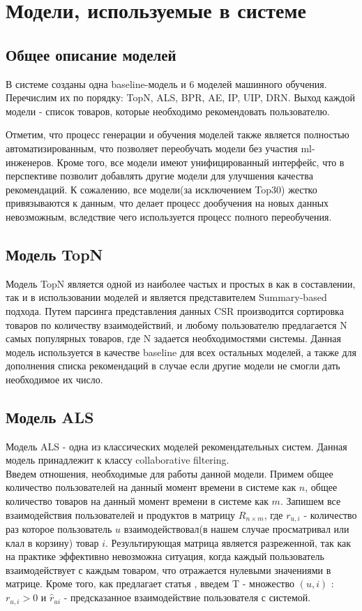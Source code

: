 \documentclass[14pt]{mmcs_article}
\begin{document}
\section{Модели, используемые в системе}

\subsection{Общее описание моделей}
В системе созданы одна baseline-модель и 6 моделей машинного обучения. Перечислим их по порядку: TopN, ALS, BPR, AE, IP, UIP, DRN. Выход каждой модели - список товаров, которые необходимо рекомендовать пользователю. 

Отметим, что процесс генерации и обучения моделей также является полностью автоматизированным, что позволяет переобучать модели без участия ml-инженеров. Кроме того, все модели имеют унифицированный интерфейс, что в перспективе позволит добавлять другие модели для улучшения качества рекомендаций. К сожалению, все модели(за исключением Top30) жестко привязываются к данным, что делает процесс дообучения на новых данных невозможным, вследствие чего используется процесс полного переобучения. 


\subsection{Модель TopN}
Модель TopN является одной из наиболее частых и простых в как в составлении, так и в использовании моделей и является представителем Summary-based подхода. \cite{ALS:recsys} Путем парсинга представления данных CSR производится сортировка товаров по количеству взаимодействий, и любому пользователю предлагается N самых популярных товаров, где N задается необходимостями системы. Данная модель используется в качестве baseline для всех остальных моделей, а также для дополнения списка рекомендаций в случае если другие модели не смогли дать необходимое их число.
\subsection{Модель ALS}
Модель ALS \cite{ALS:CFIFD} - одна из классических моделей рекомендательных систем. Данная модель принадлежит к классу collaborative filtering. \\
Введем отношения, необходимые для работы данной модели.
Примем общее количество пользователей на данный момент времени в системе как $n$, общее количество товаров на данный момент времени в системе как $m$. Запишем все взаимодействия пользователей и продуктов в матрицу $R_{n \times m}$, где $r_{u,i}$ - количество раз которое пользователь $u$ взаимодействовал(в нашем случае просматривал или клал в корзину) товар $i$.  Результирующая матрица является разреженной, так как на практике эффективно невозможна ситуация, когда каждый пользователь взаимодействует с каждым товаром, что отражается нулевыми значениями в матрице. Кроме того, как предлагает статья \cite {ALS:rwe}, введем $\mathrm{T}$ - множество $(u, i)$ : $r_{u,i} > 0$ и $\hat{r}_{ui}$ - предсказанное взаимодействие пользователя с системой.
\end{document}
